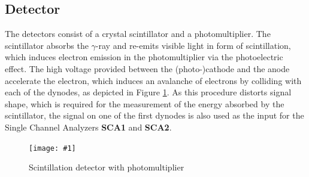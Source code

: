 \documentclass[twocolumn]{article}
\newcommand{\insertFigure}[1]{%
   \texttt{[image: \#1]}%
}
\begin{document}
\subsection{Detector}
The detectors consist of a crystal scintillator and a photomultiplier. The scintillator absorbs the $\gamma$-ray and re-emits visible light in form of scintillation, which induces electron emission in the photomultiplier via the photoelectric effect. The high voltage provided between the (photo-)cathode and the anode accelerate the electron, which induces an avalanche of electrons by colliding with each of the dynodes, as depicted in Figure \ref{fig:pmt}. As this procedure distorts signal shape, which is required for the measurement of the energy absorbed by the scintillator, the signal on one of the first dynodes is also used as the input for the Single Channel Analyzers \textbf{SCA1} and \textbf{SCA2}.
\begin{figure}[!h]
\centering
\insertFigure{pmt.png} %
\caption{Scintillation detector with photomultiplier \cite{pmt}} 
\label{fig:pmt}
\end{figure}
\end{document}
